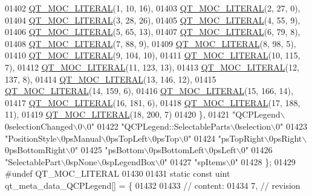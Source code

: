 \begin{DoxyCode}
01402 \hyperlink{a00067_a75bb9482d242cde0a06c9dbdc6b83abe}{QT\_MOC\_LITERAL}(1, 10, 16),
01403 \hyperlink{a00067_a75bb9482d242cde0a06c9dbdc6b83abe}{QT\_MOC\_LITERAL}(2, 27, 0),
01404 \hyperlink{a00067_a75bb9482d242cde0a06c9dbdc6b83abe}{QT\_MOC\_LITERAL}(3, 28, 26),
01405 \hyperlink{a00067_a75bb9482d242cde0a06c9dbdc6b83abe}{QT\_MOC\_LITERAL}(4, 55, 9),
01406 \hyperlink{a00067_a75bb9482d242cde0a06c9dbdc6b83abe}{QT\_MOC\_LITERAL}(5, 65, 13),
01407 \hyperlink{a00067_a75bb9482d242cde0a06c9dbdc6b83abe}{QT\_MOC\_LITERAL}(6, 79, 8),
01408 \hyperlink{a00067_a75bb9482d242cde0a06c9dbdc6b83abe}{QT\_MOC\_LITERAL}(7, 88, 9),
01409 \hyperlink{a00067_a75bb9482d242cde0a06c9dbdc6b83abe}{QT\_MOC\_LITERAL}(8, 98, 5),
01410 \hyperlink{a00067_a75bb9482d242cde0a06c9dbdc6b83abe}{QT\_MOC\_LITERAL}(9, 104, 10),
01411 \hyperlink{a00067_a75bb9482d242cde0a06c9dbdc6b83abe}{QT\_MOC\_LITERAL}(10, 115, 7),
01412 \hyperlink{a00067_a75bb9482d242cde0a06c9dbdc6b83abe}{QT\_MOC\_LITERAL}(11, 123, 13),
01413 \hyperlink{a00067_a75bb9482d242cde0a06c9dbdc6b83abe}{QT\_MOC\_LITERAL}(12, 137, 8),
01414 \hyperlink{a00067_a75bb9482d242cde0a06c9dbdc6b83abe}{QT\_MOC\_LITERAL}(13, 146, 12),
01415 \hyperlink{a00067_a75bb9482d242cde0a06c9dbdc6b83abe}{QT\_MOC\_LITERAL}(14, 159, 6),
01416 \hyperlink{a00067_a75bb9482d242cde0a06c9dbdc6b83abe}{QT\_MOC\_LITERAL}(15, 166, 14),
01417 \hyperlink{a00067_a75bb9482d242cde0a06c9dbdc6b83abe}{QT\_MOC\_LITERAL}(16, 181, 6),
01418 \hyperlink{a00067_a75bb9482d242cde0a06c9dbdc6b83abe}{QT\_MOC\_LITERAL}(17, 188, 11),
01419 \hyperlink{a00067_a75bb9482d242cde0a06c9dbdc6b83abe}{QT\_MOC\_LITERAL}(18, 200, 7)
01420     \},
01421     \textcolor{stringliteral}{"QCPLegend\(\backslash\)0selectionChanged\(\backslash\)0\(\backslash\)0"}
01422     \textcolor{stringliteral}{"QCPLegend::SelectableParts\(\backslash\)0selection\(\backslash\)0"}
01423     \textcolor{stringliteral}{"PositionStyle\(\backslash\)0psManual\(\backslash\)0psTopLeft\(\backslash\)0psTop\(\backslash\)0"}
01424     \textcolor{stringliteral}{"psTopRight\(\backslash\)0psRight\(\backslash\)0psBottomRight\(\backslash\)0"}
01425     \textcolor{stringliteral}{"psBottom\(\backslash\)0psBottomLeft\(\backslash\)0psLeft\(\backslash\)0"}
01426     \textcolor{stringliteral}{"SelectablePart\(\backslash\)0spNone\(\backslash\)0spLegendBox\(\backslash\)0"}
01427     \textcolor{stringliteral}{"spItems\(\backslash\)0"}
01428 \};
01429 \textcolor{preprocessor}{#undef QT\_MOC\_LITERAL}
01430 
01431 \textcolor{keyword}{static} \textcolor{keyword}{const} uint qt\_meta\_data\_QCPLegend[] = \{
01432 
01433  \textcolor{comment}{// content:}
01434        7,       \textcolor{comment}{// revision}

\end{DoxyCode}
